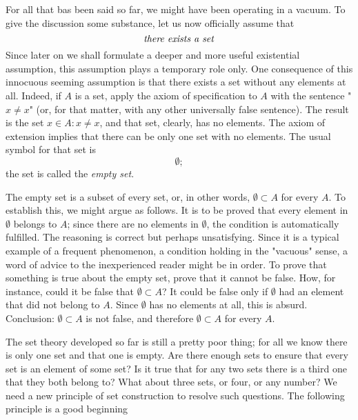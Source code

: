 
For all that bas been said so far, we might have been operating in a vacuum. To give the discussion some substance, let us now officially assume that
\begin{equation*}
\text{ \textit{there exists a set} }
\end{equation*}
Since later on we shall formulate a deeper and more useful existential assumption, this  assumption  plays  a temporary role only. One consequence of this innocuous seeming assumption is that there exists a set without any elements at all. Indeed, if $A$ is a set, apply the axiom of specification to $A$ with the sentence "$ x \neq x $"  (or, for that matter, with any other universally false sentence). The result is the set ${x \in A: x \neq x}$, and that set, clearly, has no elements. The axiom of extension implies that there can be only one set with no elements. The usual symbol for that set is 
\begin{equation*}
\emptyset ;
\end{equation*}
the set is called the \textit{empty set}. 

The empty set is a subset of every set, or, in other words, $ \emptyset \subset A$ for every $A$. To establish this, we might argue as follows. It is to be proved that every element in $ \emptyset $ belongs to $A$; since there are no elements in $ \emptyset $, the condition is automatically fulfilled. The reasoning is correct but perhaps unsatisfying. Since it is a typical example of a frequent phenomenon, a condition holding in the "vacuous" sense, a word of advice to the inexperienced reader might be in order. To prove that something is true about the empty set, prove that it cannot be false. How, for instance, could it be false that $ \emptyset \subset A$? It could be false only if $ \emptyset $ had an element that did not belong to $A$. Since $ \emptyset $ has no elements at all, this is absurd. Conclusion: $ \emptyset \subset A$ is not false, and therefore $ \emptyset \subset A$ for every $A$.

The set theory developed so far is still a pretty poor thing; for all we know there is only one set and that one is empty. Are there enough sets to ensure that every set is an element of some set? Is it true that for any two sets there is a third one that they both belong to? What about three sets, or four, or any number? We need a new principle of set construction to resolve such questions. The following principle is a good beginning 


